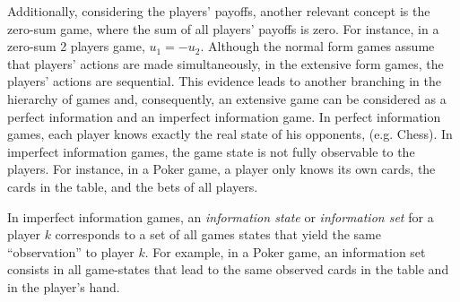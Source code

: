 Additionally, considering the players' payoffs, another relevant concept is the zero-sum game, where the sum of all players' payoffs is zero.
For instance, in a zero-sum 2 players game, $u_1 = -u_2$.
Although the normal form games assume that players' actions are made simultaneously, in the extensive form games, the players' actions are sequential.
This evidence leads to another branching in the hierarchy of games and, consequently, an extensive game can be considered as a perfect information and an imperfect information game.
In perfect information games, each player knows exactly the real state of his opponents, (e.g. Chess).
In imperfect information games, the game state is not fully observable to the players. For instance, in a Poker game, a player only knows its own cards, the cards in the table, and the bets of all players.

In imperfect information games, an \emph{information state} or \emph{information set} for a player $k$ corresponds to a set of all games states that yield the same “observation” to player $k$. For example, in a Poker game, an information set consists in all game-states that lead to the same observed cards in the table and in the player’s hand.




